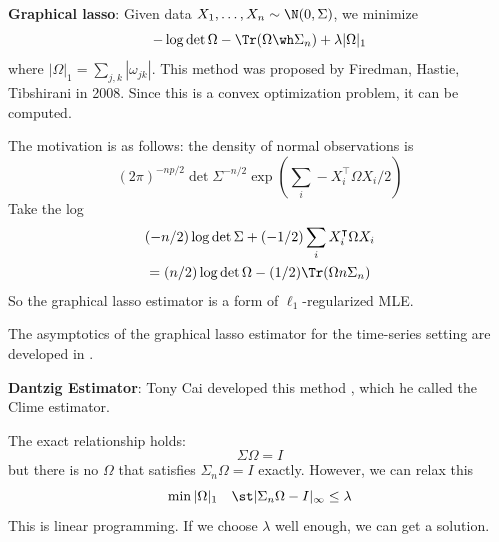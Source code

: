 \textbf{Graphical lasso}: Given data \(X_1, \dots, X_n \sim \N(0, \Sigma)\), we minimize
\[-\log \det \Omega - \Tr(\Omega \wh \Sigma_n) + \lambda |\Omega|_1\]
where \(|\Omega|_1 = \sum_{j,k} |\omega_{jk}|\). This method was proposed by Firedman, Hastie, Tibshirani in 2008. Since this is a convex optimization problem, it can be computed.

The motivation is as follows: the density of normal observations is
\[(2\pi)^{-np/2} \det \Sigma^{-n/2} \exp \left( \sum_i -X_i^\intercal \Omega X_i / 2 \right)\]
Take the log
\[\begin{gathered}(- n/2) \log \det \Sigma + (-1/2) \sum_i X_i^\intercal \Omega X_i \\
= (n/2) \log \det \Omega - (1/2) \Tr(\Omega n\Sigma_n)\end{gathered}\]
So the graphical lasso estimator is a form of \(\ell_1\)-regularized MLE.

The asymptotics of the graphical lasso estimator for the time-series setting are developed in \citet{CXW13}.

\textbf{Dantzig Estimator}: Tony Cai developed this method \citep{CLM11}, which he called the Clime estimator.

The exact relationship holds:
\[\Sigma \Omega = I\]
but there is no \(\Omega\) that satisfies \(\Sigma_n \Omega = I\) exactly. However, we can relax this
\[\min |\Omega|_1 \quad \st |\Sigma_n \Omega - I|_\infty \leq \lambda\]
This is linear programming. If we choose \(\lambda\) well enough, we can get a solution.
